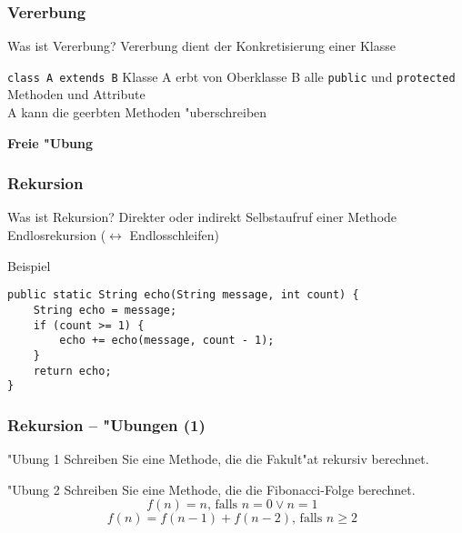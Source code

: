 \documentclass{beamer}
\begin{document}
\begin{frame}
\frametitle{Vererbung}
\begin{block}{Was ist Vererbung?}\pause
Vererbung dient der Konkretisierung einer Klasse
\end{block}

\pause

\begin{block}{\texttt{class A extends B}}\pause
Klasse A erbt von Oberklasse B alle \lstinline|public| und \lstinline|protected| Methoden und Attribute\pause\\
A kann die geerbten Methoden "uberschreiben
\end{block}

\pause

\begin{center}
\textbf{\Huge Freie "Ubung}
\end{center}
\end{frame}


\begin{frame}[containsverbatim]
\frametitle{Rekursion}
\begin{block}{Was ist Rekursion?}
Direkter oder indirekt Selbstaufruf einer Methode\\
\alert{Endlosrekursion ($\leftrightarrow$ Endlosschleifen)}
\end{block}

\begin{block}{Beispiel}
\begin{lstlisting}
public static String echo(String message, int count) {
	String echo = message;
	if (count >= 1) {
		echo += echo(message, count - 1);
	}
	return echo;
}
\end{lstlisting}
\end{block}
\end{frame}


\begin{frame}
\frametitle{Rekursion -- "Ubungen (1)}
\begin{block}{"Ubung 1}
Schreiben Sie eine Methode, die die Fakult"at rekursiv berechnet.
\end{block}

\pause

\begin{block}{"Ubung 2}
Schreiben Sie eine Methode, die die Fibonacci-Folge berechnet.
$$f(n) = n\textrm{, falls $n = 0 \vee n = 1$ }$$
$$f(n) = f(n - 1) + f(n - 2)\textrm{, falls $n \ge 2$ }$$
\end{block}
\end{frame}
\end{document}
